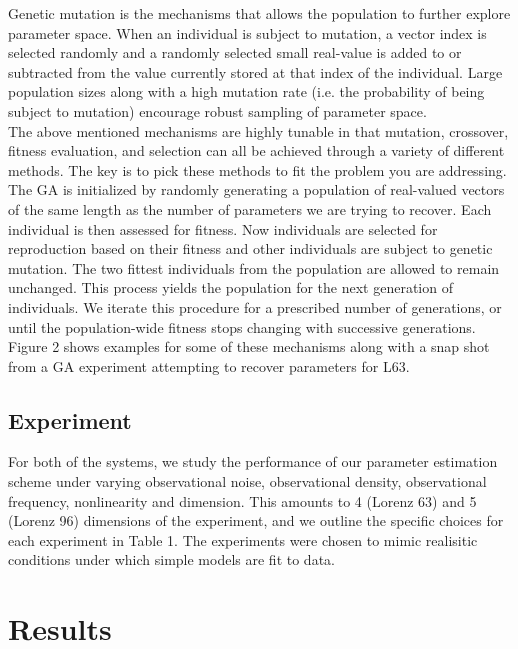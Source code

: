 \documentclass[onecolumn]{article}
\begin{document}
\begin{multicols}{2}
\indent Genetic mutation is the mechanisms that allows the population to further explore parameter space. When an individual is subject to mutation, a vector index is selected randomly and a randomly selected small real-value is added to or subtracted from the value currently stored at that index of the individual. Large population sizes along with a high mutation rate (i.e. the probability of being subject to mutation) encourage robust sampling of parameter space.\\
\indent The above mentioned mechanisms are highly tunable in that mutation, crossover, fitness evaluation, and selection can all be achieved through a variety of different methods. The key is to pick these methods to fit the problem you are addressing. The GA is initialized by randomly generating a population of real-valued vectors of the same length as the number of parameters we are trying to recover. Each individual is then assessed for fitness. Now individuals are selected for reproduction based on their fitness and other individuals are subject to genetic mutation. The two fittest individuals from the population are allowed to remain unchanged. This process yields the population for the next generation of individuals. We iterate this procedure for a prescribed number of generations, or until the population-wide fitness stops changing with successive generations. Figure 2 shows examples for some of these mechanisms along with a snap shot from a GA experiment attempting to recover parameters for L63.

\subsection{Experiment}

For both of the systems, we study the performance of our parameter estimation scheme under varying observational noise, observational density, observational frequency, nonlinearity and dimension.
This amounts to 4 (Lorenz 63) and 5 (Lorenz 96) dimensions of the experiment, and we outline the specific choices for each experiment in Table 1. %
The experiments were chosen to mimic realisitic conditions under which simple models are fit to data.


\section{Results}



\end{multicols}
\end{document}

